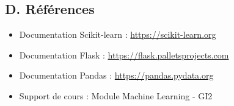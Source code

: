\documentclass[11pt,a4paper]{article}
\begin{document}
\subsection*{D. Références}
\begin{itemize}
    \item Documentation Scikit-learn : \url{https://scikit-learn.org}
    \item Documentation Flask : \url{https://flask.palletsprojects.com}
    \item Documentation Pandas : \url{https://pandas.pydata.org}
    \item Support de cours : Module Machine Learning - GI2
\end{itemize}
\end{document}
